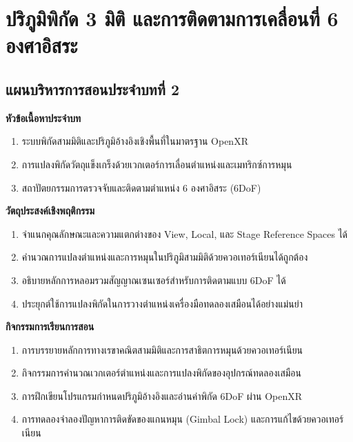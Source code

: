 \chapter{ปริภูมิพิกัด 3 มิติ และการติดตามการเคลื่อนที่ 6 องศาอิสระ}
\label{chap:ch02}

\section*{แผนบริหารการสอนประจำบทที่ 2}

\noindent\textbf{หัวข้อเนื้อหาประจำบท}
\begin{enumerate}
    \item ระบบพิกัดสามมิติและปริภูมิอ้างอิงเชิงพื้นที่ในมาตรฐาน OpenXR
    \item การแปลงพิกัดวัตถุแข็งเกร็งด้วยเวกเตอร์การเลื่อนตำแหน่งและเมทริกซ์การหมุน
    \item สถาปัตยกรรมการตรวจจับและติดตามตำแหน่ง 6 องศาอิสระ (6DoF)
\end{enumerate}

\noindent\textbf{วัตถุประสงค์เชิงพฤติกรรม}
\begin{enumerate}
    \item จำแนกคุณลักษณะและความแตกต่างของ View, Local, และ Stage Reference Spaces ได้
    \item คำนวณการแปลงตำแหน่งและการหมุนในปริภูมิสามมิติด้วยควอเทอร์เนียนได้ถูกต้อง
    \item อธิบายหลักการหลอมรวมสัญญาณเซนเซอร์สำหรับการติดตามแบบ 6DoF ได้
    \item ประยุกต์ใช้การแปลงพิกัดในการวางตำแหน่งเครื่องมือทดลองเสมือนได้อย่างแม่นยำ
\end{enumerate}

\newpage

\noindent\textbf{กิจกรรมการเรียนการสอน}
\begin{enumerate}
    \item การบรรยายหลักการทางเรขาคณิตสามมิติและการสาธิตการหมุนด้วยควอเทอร์เนียน
    \item กิจกรรมการคำนวณเวกเตอร์ตำแหน่งและการแปลงพิกัดของอุปกรณ์ทดลองเสมือน
    \item การฝึกเขียนโปรแกรมกำหนดปริภูมิอ้างอิงและอ่านค่าพิกัด 6DoF ผ่าน OpenXR
    \item การทดลองจำลองปัญหาการติดขัดของแกนหมุน (Gimbal Lock) และการแก้ไขด้วยควอเทอร์เนียน
\end{enumerate}

